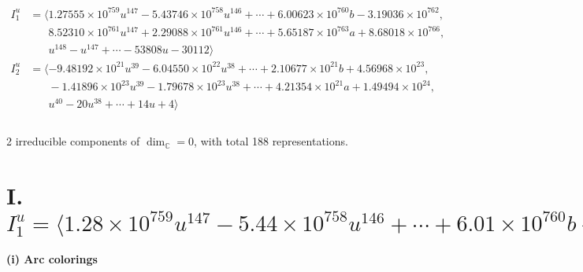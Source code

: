 \documentclass[1p]{elsarticle_modified}
\theoremstyle{definition}
\begin{document}
\begin{align*}
I^u_{1}&=\langle 
1.27555\times10^{759} u^{147}-5.43746\times10^{758} u^{146}+\cdots+6.00623\times10^{760} b-3.19036\times10^{762},\\
\phantom{I^u_{1}}&\phantom{= \langle  }8.52310\times10^{761} u^{147}+2.29088\times10^{761} u^{146}+\cdots+5.65187\times10^{763} a+8.68018\times10^{766},\\
\phantom{I^u_{1}}&\phantom{= \langle  }u^{148}- u^{147}+\cdots-53808 u-30112\rangle \\
I^u_{2}&=\langle 
-9.48192\times10^{21} u^{39}-6.04550\times10^{22} u^{38}+\cdots+2.10677\times10^{21} b+4.56968\times10^{23},\\
\phantom{I^u_{2}}&\phantom{= \langle  }-1.41896\times10^{23} u^{39}-1.79678\times10^{23} u^{38}+\cdots+4.21354\times10^{21} a+1.49494\times10^{24},\\
\phantom{I^u_{2}}&\phantom{= \langle  }u^{40}-20 u^{38}+\cdots+14 u+4\rangle \\
\\
\end{align*}
\raggedright * 2 irreducible components of $\dim_{\mathbb{C}}=0$, with total 188 representations.\\
\newpage
\renewcommand{\arraystretch}{1}
\centering \section*{I. $I^u_{1}= \langle 1.28\times10^{759} u^{147}-5.44\times10^{758} u^{146}+\cdots+6.01\times10^{760} b-3.19\times10^{762},\;8.52\times10^{761} u^{147}+2.29\times10^{761} u^{146}+\cdots+5.65\times10^{763} a+8.68\times10^{766},\;u^{148}- u^{147}+\cdots-53808 u-30112 \rangle$}
\flushleft \textbf{(i) Arc colorings}\\
\end{document}
